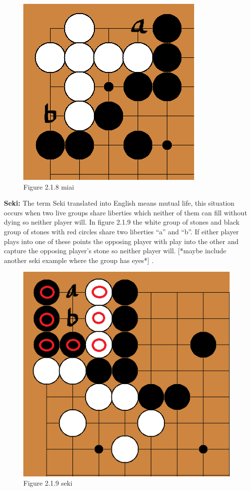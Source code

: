 \documentclass{l3proj}
\begin{document}
\begin{figure}[H]
\centering
\includegraphics[scale=0.5]{Images/miai.png}
\caption{Figure 2.1.8 miai}
\end{figure}

\textbf{Seki:} The term Seki translated into English means mutual life, this situation occurs when two live groups share liberties which neither of them can fill without dying so neither player will.
 In figure 2.1.9 the white group of stones and black group of stones with red circles share two liberties “a” and “b”. If either player plays into one of these points the opposing player with play into the other and capture the opposing player’s stone so neither player will. [*maybe include another seki example where the group has eyes*] .

\begin{figure}[H]
\centering
\includegraphics[scale=0.5]{Images/seki.png}
\caption{Figure 2.1.9 seki}
\end{figure}
\end{document}
